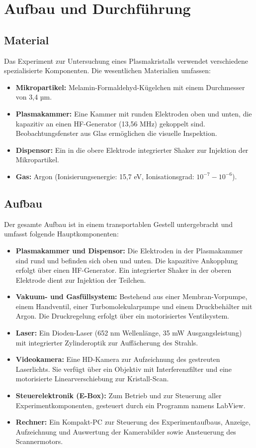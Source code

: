 \documentclass[12pt,a4paper,ngerman]{report}
\begin{document}
\chapter{Aufbau und Durchführung}
	\section{Material}
	Das Experiment zur Untersuchung eines Plasmakristalls verwendet verschiedene spezialisierte Komponenten. Die wesentlichen Materialien umfassen:

\begin{itemize}
    \item \textbf{Mikropartikel:} Melamin-Formaldehyd-Kügelchen mit einem Durchmesser von 3,4 µm.
    \item \textbf{Plasmakammer:} Eine Kammer mit runden Elektroden oben und unten, die kapazitiv an einen HF-Generator (13,56 MHz) gekoppelt sind. Beobachtungsfenster aus Glas ermöglichen die visuelle Inspektion.
    \item \textbf{Dispensor:} Ein in die obere Elektrode integrierter Shaker zur Injektion der Mikropartikel.
    \item \textbf{Gas:} Argon (Ionisierungsenergie: 15,7 eV, Ionisationsgrad: \(10^{-7} - 10^{-6}\)).
\end{itemize}

\section{Aufbau}
Der gesamte Aufbau ist in einem transportablen Gestell untergebracht und umfasst folgende Hauptkomponenten:
\begin{itemize}
    \item \textbf{Plasmakammer und Dispensor:} Die Elektroden in der Plasmakammer sind rund und befinden sich oben und unten. Die kapazitive Ankopplung erfolgt über einen HF-Generator. Ein integrierter Shaker in der oberen Elektrode dient zur Injektion der Teilchen.
    \item \textbf{Vakuum- und Gasfüllsystem:} Bestehend aus einer Membran-Vorpumpe, einem Handventil, einer Turbomolekularpumpe und einem Druckbehälter mit Argon. Die Druckregelung erfolgt über ein motorisiertes Ventilsystem.
    \item \textbf{Laser:} Ein Dioden-Laser (652 nm Wellenlänge, 35 mW Ausgangsleistung) mit integrierter Zylinderoptik zur Auffächerung des Strahls.
    \item \textbf{Videokamera:} Eine HD-Kamera zur Aufzeichnung des gestreuten Laserlichts. Sie verfügt über ein Objektiv mit Interferenzfilter und eine motorisierte Linearverschiebung zur Kristall-Scan.
    \item \textbf{Steuerelektronik (E-Box):} Zum Betrieb und zur Steuerung aller Experimentkomponenten, gesteuert durch ein Programm namens \glqq{}LabView\grqq{}.
    \item \textbf{Rechner:} Ein Kompakt-PC zur Steuerung des Experimentaufbaus, Anzeige, Aufzeichnung und Auswertung der Kamerabilder sowie Ansteuerung des Scannermotors.
\end{itemize}
\end{document}
